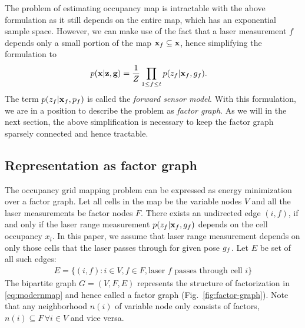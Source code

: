 \documentclass[letterpaper, 10 pt, conference]{ieeeconf} %
\begin{document}
The problem of estimating occupancy map is intractable with the above
formulation as it still depends on the entire map, which has an exponential
sample space. However, we can make use of the fact that
a laser measurement $f$ depends only a small portion of the map $\mathbf{x}_f
\subseteq \mathbf{x}$, hence simplifying the formulation to
\begin{align}
 p(\mathbf{x} | \mathbf{z}, \mathbf{g}) &= \frac{1}{Z} \prod_{1 \le f \le t}
 p(z_f|\mathbf{x}_f, g_f).
 \label{eq:modernmap}
\end{align}
The term $p(z_f|\mathbf{x}_f, p_f)$ is called the \emph{forward sensor model}.
With this formulation, we are in a position to describe the problem as
\emph{factor graph}. As we will in the next section, the above
simplification is necessary to keep the factor graph sparsely connected
and hence tractable.

\subsection{Representation as factor graph}
\label{sec:notation}
The occupancy grid mapping problem can be expressed as energy minimization
over a factor graph. Let all cells in the map be the variable nodes $V$ and all
the laser measurements be factor nodes $F$. 
There exists an undirected edge $(i, f)$, if and only if the laser
range measurement $p(z_f|\mathbf{x}_f, g_f)$ depends on the cell occupancy 
$x_i$. In this paper, we assume that laser range measurement depends on only
those cells that the laser passes through for given pose $g_f$. 
Let $E$ be set of all such edges:
\begin{align}
  E = \{(i, f) : i \in V, f \in F, \text{laser $f$ passes through cell $i$}\}
\end{align}
The bipartite graph $G = (V, F, E)$ 
represents the structure of factorization in \eqref{eq:modernmap} and hence
called a factor graph \cite{kschischang2001factor}
(Fig.~\ref{fig:factor-graph}).  Note that any neighborhood $n(i)$ of variable
node only consists of factors, $n(i)\subseteq F \, \forall i \in V$ and vice
versa.
\end{document}
